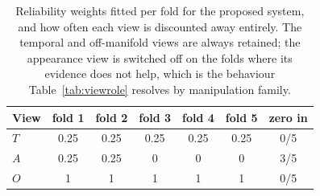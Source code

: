 \begin{table}[t]
\centering
\caption{Reliability weights fitted per fold for the proposed system, and how often each view is discounted away entirely. The temporal and off-manifold views are always retained; the appearance view is switched off on the folds where its evidence does not help, which is the behaviour Table~\ref{tab:viewrole} resolves by manipulation family.}
\label{tab:weights}
\small
\begin{tabular}{lccccc c}
\toprule
View & fold 1 & fold 2 & fold 3 & fold 4 & fold 5 & zero in \\
\midrule
$T$ & 0.25 & 0.25 & 0.25 & 0.25 & 0.25 & 0/5 \\
$A$ & 0.25 & 0.25 & 0 & 0 & 0 & 3/5 \\
$O$ & 1 & 1 & 1 & 1 & 1 & 0/5 \\
\bottomrule
\end{tabular}
\end{table}
